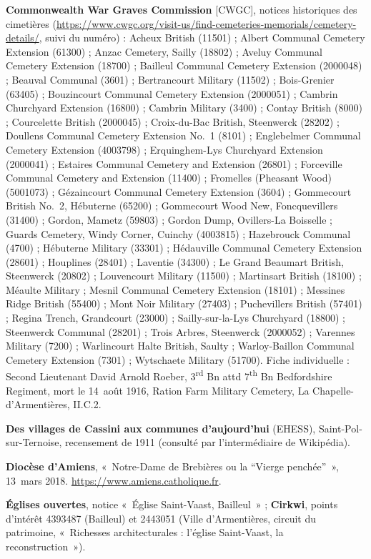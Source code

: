 \begin{biblist}
\item \textbf{Commonwealth War Graves Commission} [CWGC], notices historiques des cimetières (\url{https://www.cwgc.org/visit-us/find-cemeteries-memorials/cemetery-details/}, suivi du numéro) : Acheux British (11501) ; Albert Communal Cemetery Extension (61300) ; Anzac Cemetery, Sailly (18802) ; Aveluy Communal Cemetery Extension (18700) ; Bailleul Communal Cemetery Extension (2000048) ; Beauval Communal (3601) ; Bertrancourt Military (11502) ; Bois-Grenier (63405) ; Bouzincourt Communal Cemetery Extension (2000051) ; Cambrin Churchyard Extension (16800) ; Cambrin Military (3400) ; Contay British (8000) ; Courcelette British (2000045) ; Croix-du-Bac British, Steenwerck (28202) ; Doullens Communal Cemetery Extension No.~1 (8101) ; Englebelmer Communal Cemetery Extension (4003798) ; Erquinghem-Lys Churchyard Extension (2000041) ; Estaires Communal Cemetery and Extension (26801) ; Forceville Communal Cemetery and Extension (11400) ; Fromelles (Pheasant Wood) (5001073) ; Gézaincourt Communal Cemetery Extension (3604) ; Gommecourt British No.~2, Hébuterne (65200) ; Gommecourt Wood New, Foncquevillers (31400) ; Gordon, Mametz (59803) ; Gordon Dump, Ovillers-La Boisselle ; Guards Cemetery, Windy Corner, Cuinchy (4003815) ; Hazebrouck Communal (4700) ; Hébuterne Military (33301) ; Hédauville Communal Cemetery Extension (28601) ; Houplines (28401) ; Laventie (34300) ; Le Grand Beaumart British, Steenwerck (20802) ; Louvencourt Military (11500) ; Martinsart British (18100) ; Méaulte Military ; Mesnil Communal Cemetery Extension (18101) ; Messines Ridge British (55400) ; Mont Noir Military (27403) ; Puchevillers British (57401) ; Regina Trench, Grandcourt (23000) ; Sailly-sur-la-Lys Churchyard (18800) ; Steenwerck Communal (28201) ; Trois Arbres, Steenwerck (2000052) ; Varennes Military (7200) ; Warlincourt Halte British, Saulty ; Warloy-Baillon Communal Cemetery Extension (7301) ; Wytschaete Military (51700). Fiche individuelle : Second Lieutenant David Arnold Roeber, 3\textsuperscript{rd} Bn attd 7\textsuperscript{th} Bn Bedfordshire Regiment, mort le 14~août 1916, Ration Farm Military Cemetery, La Chapelle-d'Armentières, II.C.2.
\item \textbf{Des villages de Cassini aux communes d'aujourd'hui} (EHESS), Saint-Pol-sur-Ternoise, recensement de 1911 (consulté par l'intermédiaire de Wikipédia).
\item \textbf{Diocèse d'Amiens}, «~Notre-Dame de Brebières ou la “Vierge penchée”~», 13~mars 2018. \url{https://www.amiens.catholique.fr}.
\item \textbf{Églises ouvertes}, notice «~Église Saint-Vaast, Bailleul~» ; \textbf{Cirkwi}, points d'intérêt 4393487 (Bailleul) et 2443051 (Ville d'Armentières, circuit du patrimoine, «~Richesses architecturales : l'église Saint-Vaast, la reconstruction~»).

\end{biblist}
